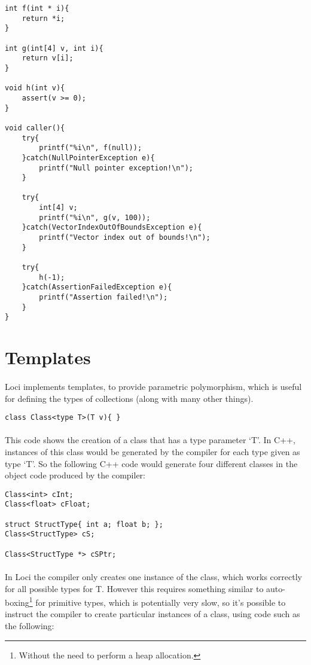 \documentclass[12pt,twoside,notitlepage]{report}
\begin{document}
\small{
\begin{verbatim}
int f(int * i){
    return *i;
}

int g(int[4] v, int i){
    return v[i];
}

void h(int v){
    assert(v >= 0);
}

void caller(){
    try{
        printf("%i\n", f(null));
    }catch(NullPointerException e){
        printf("Null pointer exception!\n");
    }
    
    try{
        int[4] v;
        printf("%i\n", g(v, 100));
    }catch(VectorIndexOutOfBoundsException e){
        printf("Vector index out of bounds!\n");
    }
    
    try{
        h(-1);
    }catch(AssertionFailedException e){
        printf("Assertion failed!\n");
    }
}
\end{verbatim}
}

\section{Templates}

\paragraph{}
Loci implements templates, to provide parametric polymorphism, which is useful for defining the types of collections (along with many other things).

\small{
\begin{verbatim}
class Class<type T>(T v){ }
\end{verbatim}
}

\paragraph{}
This code shows the creation of a class that has a type parameter `T'. In C++, instances of this class would be generated by the compiler for each type given as type `T'. So the following C++ code would generate four different classes in the object code produced by the compiler:

\small{
\begin{verbatim}
Class<int> cInt;
Class<float> cFloat;

struct StructType{ int a; float b; };
Class<StructType> cS;

Class<StructType *> cSPtr;
\end{verbatim}
}

\paragraph{}
In Loci the compiler only creates one instance of the class, which works correctly for all possible types for T. However this requires something similar to auto-boxing\footnote{Without the need to perform a heap allocation.} for primitive types, which is potentially very slow, so it's possible to instruct the compiler to create particular instances of a class, using code such as the following:
\end{document}
